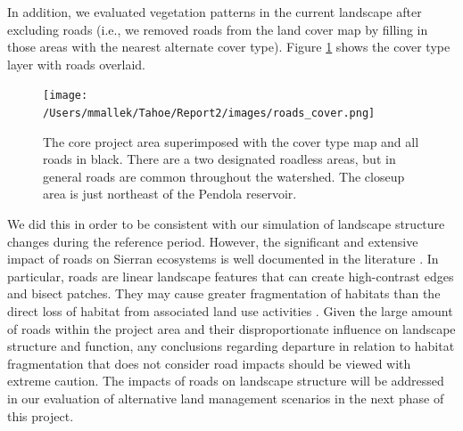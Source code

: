 
In addition, we evaluated vegetation patterns in the current landscape after excluding roads (i.e., we removed roads from the land cover map by filling in those areas with the nearest alternate cover type). Figure \ref{fig:roadcovermap} shows the cover type layer with roads overlaid. %
%
\begin{figure}[!htbp]
  \centering
  \texttt{[image: /Users/mmallek/Tahoe/Report2/images/roads\_cover.png]}
  \caption{The core project area superimposed with the cover type map and all roads in black. There are a two designated roadless areas, but in general roads are common throughout the watershed. The closeup area is just northeast of the Pendola reservoir.} 
  \label{fig:roadcovermap}
\end{figure}
%
We did this in order to be consistent with our simulation of landscape structure changes during the reference period. However, the significant and extensive impact of roads on Sierran ecosystems is well documented in the literature \citep{Karr2004,Trombulak2000,Gucinski2001,Theobald2011}.  In particular, roads are linear landscape features that can create high-contrast edges and bisect patches. They may cause greater fragmentation of habitats than the direct loss of habitat from associated land use activities \citep{Gucinski2001,Tinker1998,Mcgarigal2001}. Given the large amount of roads within the project area and their disproportionate influence on landscape structure and function, any conclusions regarding departure in relation to habitat fragmentation that does not consider road impacts should be viewed with extreme caution. The impacts of roads on landscape structure will be addressed in our evaluation of alternative land management scenarios in the next phase of this project.

